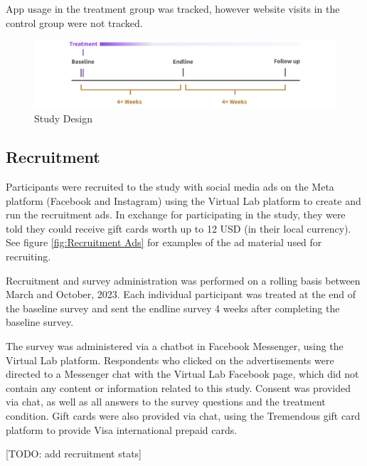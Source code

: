 \documentclass{article}
\begin{document}
App usage in the treatment group was tracked, however website visits in the control group were not tracked.

\vspace{1cm}

\begin{figure}[h]
\includegraphics[width=\textwidth]{images/design-timeline.png}
\caption{Study Design}
\label{fig:Study Design}
\end{figure}

\subsection*{Recruitment}

Participants were recruited to the study with social media ads on the Meta platform (Facebook and Instagram) using the Virtual Lab platform to create and run the recruitment ads. In exchange for participating in the study, they were told they could receive gift cards worth up to 12 USD (in their local currency). See figure \ref{fig:Recruitment Ads} for examples of the ad material used for recruiting.

Recruitment and survey administration was performed on a rolling basis between March and October, 2023. Each individual participant was treated at the end of the baseline survey and sent the endline survey 4 weeks after completing the baseline survey.

The survey was administered via a chatbot in Facebook Messenger, using the Virtual Lab platform. Respondents who clicked on the advertisements were directed to a Messenger chat with the Virtual Lab Facebook page, which did not contain any content or information related to this study. Consent was provided via chat, as well as all answers to the survey questions and the treatment condition. Gift cards were also provided via chat, using the Tremendous gift card platform to provide Visa international prepaid cards.

[TODO: add recruitment stats]
\end{document}
